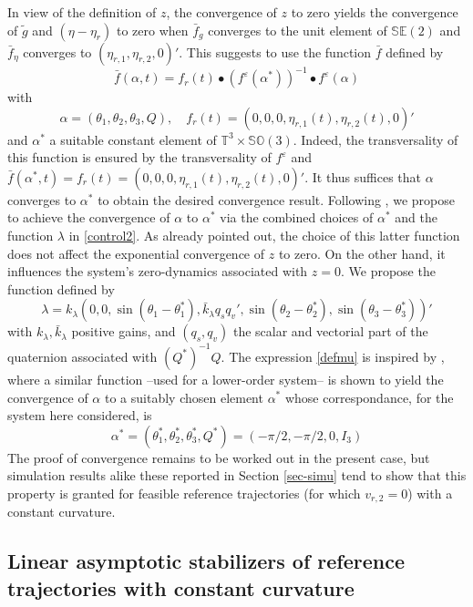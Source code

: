\documentclass[a4paper,twoside]{article}
\def \TT {{\mathbb T}}
\def \eps {\varepsilon}
\def \SO {{\mathbb S}{\mathbb O}}
\def \SE {{\mathbb S}{\mathbb E}}
\begin{document}
In view of the definition of $z$, the convergence of $z$ to zero yields the convergence of $\tilde{g}$ and 
$(\eta-\eta_r)$ to zero when $\bar{f}_g$ converges to the unit element of $\SE(2)$ and $\bar{f}_{\eta}$ 
converges to $(\eta_{r,1},\eta_{r,2},0)'$. This suggests to use the function $\bar{f}$ defined by
\begin{equation}
\label{deffbar}
\bar f(\alpha,t) = f_r(t) \bullet (f^\eps(\alpha^*))^{-1} \bullet f^\eps(\alpha)
\end{equation}
with 
\[
\alpha=(\theta_1, \theta_2, \theta_3, Q), \quad 
f_r(t)= (0,0,0,\eta_{r,1}(t),\eta_{r,2}(t),0)'
\]
and $\alpha^*$ a suitable constant element of $\TT^3 \times \SO(3)$. Indeed, the transversality of this function is ensured by the transversality of $f^\eps$ and
$\bar f (\alpha^*,t) = f_r(t)= (0,0,0,\eta_{r,1}(t),\eta_{r,2}(t),0)'$. It thus suffices that $\alpha$ converges to $\alpha^*$ to obtain the desired convergence result.
Following \cite{ms11}, we propose to achieve the convergence of $\alpha$ to $\alpha^*$ via the combined choices of $\alpha^*$ and the function $\lambda$ in \eqref{control2}. 
As already pointed out, the choice of this latter function does not affect the
exponential  convergence of $z$ to zero. On the other hand, it influences the system's zero-dynamics associated with
$z=0$. We propose the function defined by
\begin{equation}
\label{defmu}
\lambda= k_{\lambda} (0,0,\sin( \theta_1 -\theta_1^*), \bar k_{\lambda} q_s q_v', \sin( \theta_2 -\theta_2^*),
 \sin( \theta_3 -\theta_3^*))'
\end{equation}
with $k_{\lambda}, \bar k_{\lambda}$ positive gains, and $(q_s, q_v)$ the scalar and vectorial part of
the quaternion associated with $(Q^*)^{-1} Q$.  The expression \eqref{defmu} is inspired by \cite{ms11}, 
where a similar function --used for a lower-order system-- is shown to yield the convergence of $\alpha$ to a suitably chosen element $\alpha^*$ whose correspondance, for the system here considered, is
\begin{equation}
\label{alpha_star}
\alpha^*= (\theta_1^*,\theta_2^*,\theta_3^*,Q^*)= (-\pi/2,-\pi/2,0, I_3)
\end{equation}
The proof of convergence remains to be worked out in the present case, but simulation results alike these reported 
in Section \ref{sec-simu} tend to show that this property is granted for feasible reference trajectories (for which $v_{r,2}=0$) with a constant curvature.

\subsection{Linear asymptotic stabilizers of reference trajectories 
with constant curvature}
\label{sec-lin}
\end{document}
